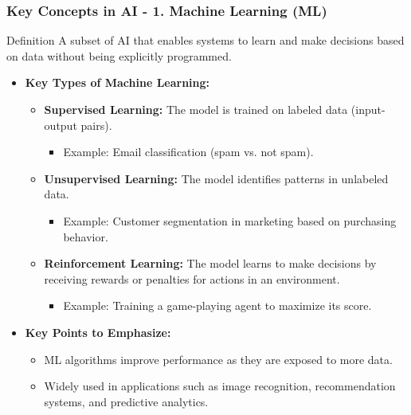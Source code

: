 \documentclass[aspectratio=169]{beamer}
\begin{document}
\begin{frame}[fragile]
    \frametitle{Key Concepts in AI - 1. Machine Learning (ML)}
    \begin{block}{Definition}
        A subset of AI that enables systems to learn and make decisions based on data without being explicitly programmed.
    \end{block}

    \begin{itemize}
        \item \textbf{Key Types of Machine Learning:}
        \begin{itemize}
            \item \textbf{Supervised Learning:} The model is trained on labeled data (input-output pairs).
            \begin{itemize}
                \item Example: Email classification (spam vs. not spam).
            \end{itemize}
            \item \textbf{Unsupervised Learning:} The model identifies patterns in unlabeled data.
            \begin{itemize}
                \item Example: Customer segmentation in marketing based on purchasing behavior.
            \end{itemize}
            \item \textbf{Reinforcement Learning:} The model learns to make decisions by receiving rewards or penalties for actions in an environment.
            \begin{itemize}
                \item Example: Training a game-playing agent to maximize its score.
            \end{itemize}
        \end{itemize}
        
        \item \textbf{Key Points to Emphasize:}
        \begin{itemize}
            \item ML algorithms improve performance as they are exposed to more data.
            \item Widely used in applications such as image recognition, recommendation systems, and predictive analytics.
        \end{itemize}
    \end{itemize}
\end{frame}
\end{document}
